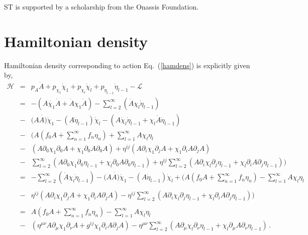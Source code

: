 \documentclass[a4paper,12pt]{article}
\newcommand{\+}{^{\dagger}}
\newcommand{\2}{\frac{1}{2}}
\newcommand{\3}{\frac{1}{3}}
\newcommand{\4}{\frac{1}{4}}
\newcommand{\6}{\frac{1}{6}}
\newcommand{\8}{\frac{1}{8}}
\begin{document}
ST is supported by a scholarship from the Onassis Foundation. 
\appendix



\section{Hamiltonian density}\label{hamdensapp}
Hamiltonian density corresponding to action Eq.~(\ref{hamdens}) is explicitly given by, 
\begin{eqnarray}\label{hamapp-1}
\mathcal{H}&=&p_A\dot{A}+p_{\chi_1}\dot{\chi}_1+p_{\chi_l}\dot{\chi}_l+p_{\eta_{l-1}}\dot{\eta}_{l-1}-\mathcal{L}\nonumber\\
&=&-(A\dot{\chi_1}
 \dot{A}+\dot{A}\chi_1
\dot{A})-\sum^{\infty}_{l=2}(\dot{A}\chi_l\dot{\eta}_{l-1})\nonumber\\
&-&(A\dot{
A)}\dot{\chi}_1-(A\dot{\eta}_{l-1})\dot{\chi}_l-(A\dot{\chi}_l
\dot{\eta}_{l-1}+\chi_l
 \dot{A}\dot{\eta}_{l-1})\nonumber\\
 &-&\Bigg(A(f_{0}A+\sum^{\infty}_{n=1}f_n\eta_{n})+\sum ^{\infty}_{l=1}A\chi_l
\eta_l\nonumber\\
&-&(A\partial_0\chi_1  \partial_0 A+\chi_1
\partial_0 A
\partial_0 A)+\eta^{ij}(A\partial_i\chi_1  \partial_j A+\chi_1
\partial_i A
\partial_j A)\nonumber\\
&-&\sum^{\infty}_{l=2}(A\partial_0\chi_1  \partial_0\eta_{l-1}
+\chi_l
\partial_0 A
\partial_0 \eta_{l-1})+\eta^{ij}\sum^{\infty}_{l=2}(A\partial_i\chi_l  \partial_j\eta_{l-1}
+\chi_l
\partial_i A
\partial_j \eta_{l-1})\Bigg)\nonumber\\
&=&-\sum^{\infty}_{l=2}(\dot{A}\chi_l\dot{\eta}_{l-1})
-(A\dot{
A)}\dot{\chi}_1-(A\dot{\eta}_{l-1})\dot{\chi}_l
 +\Bigg(A(f_{0}A+\sum^{\infty}_{n=1}f_n\eta_{n})-\sum ^{\infty}_{l=1}A\chi_l
\eta_l\nonumber\\ \\
&-&\eta^{ij}(A\partial_i\chi_1  \partial_j A+\chi_1
\partial_i A
\partial_j A)
-\eta^{ij}\sum^{\infty}_{l=2}(A\partial_i\chi_l  \partial_j\eta_{l-1}
+\chi_l
\partial_i A
\partial_j \eta_{l-1})\Bigg)\nonumber\\ \\
&=&
A(f_{0}A+\sum^{\infty}_{n=1}f_n\eta_{n})-\sum ^{\infty}_{l=1}A\chi_l
\eta_l\nonumber\\
&-&(\eta ^{\mu\nu}A\partial_{\mu}\chi_1  \partial_\nu A+g^{ij}\chi_1
\partial_i A
\partial_j A)
-\eta^{\mu\nu}\sum^{\infty}_{l=2}(A\partial_\mu\chi_l  \partial_\nu\eta_{l-1}
+\chi_l
\partial_\mu A
\partial_\nu \eta_{l-1})\,.\nonumber\\
\end{eqnarray} 
\end{document}
